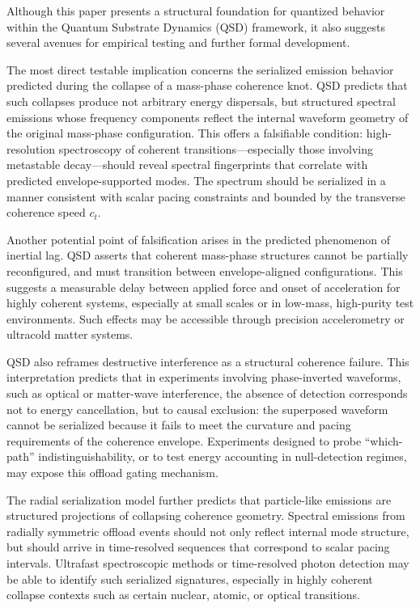 \documentclass[entropy,article,submit,pdftex,moreauthors]{Definitions/mdpi}
\begin{document}
Although this paper presents a structural foundation for quantized behavior within the Quantum Substrate Dynamics (QSD) framework, it also suggests several avenues for empirical testing and further formal development.

The most direct testable implication concerns the serialized emission behavior predicted during the collapse of a mass-phase coherence knot. QSD predicts that such collapses produce not arbitrary energy dispersals, but structured spectral emissions whose frequency components reflect the internal waveform geometry of the original mass-phase configuration. This offers a falsifiable condition: high-resolution spectroscopy of coherent transitions—especially those involving metastable decay—should reveal spectral fingerprints that correlate with predicted envelope-supported modes. The spectrum should be serialized in a manner consistent with scalar pacing constraints and bounded by the transverse coherence speed \( c_t \).

Another potential point of falsification arises in the predicted phenomenon of inertial lag. QSD asserts that coherent mass-phase structures cannot be partially reconfigured, and must transition between envelope-aligned configurations. This suggests a measurable delay between applied force and onset of acceleration for highly coherent systems, especially at small scales or in low-mass, high-purity test environments. Such effects may be accessible through precision accelerometry or ultracold matter systems.

QSD also reframes destructive interference as a structural coherence failure. This interpretation predicts that in experiments involving phase-inverted waveforms, such as optical or matter-wave interference, the absence of detection corresponds not to energy cancellation, but to causal exclusion: the superposed waveform cannot be serialized because it fails to meet the curvature and pacing requirements of the coherence envelope. Experiments designed to probe “which-path” indistinguishability, or to test energy accounting in null-detection regimes, may expose this offload gating mechanism.

The radial serialization model further predicts that particle-like emissions are structured projections of collapsing coherence geometry. Spectral emissions from radially symmetric offload events should not only reflect internal mode structure, but should arrive in time-resolved sequences that correspond to scalar pacing intervals. Ultrafast spectroscopic methods or time-resolved photon detection may be able to identify such serialized signatures, especially in highly coherent collapse contexts such as certain nuclear, atomic, or optical transitions.
\end{document}
